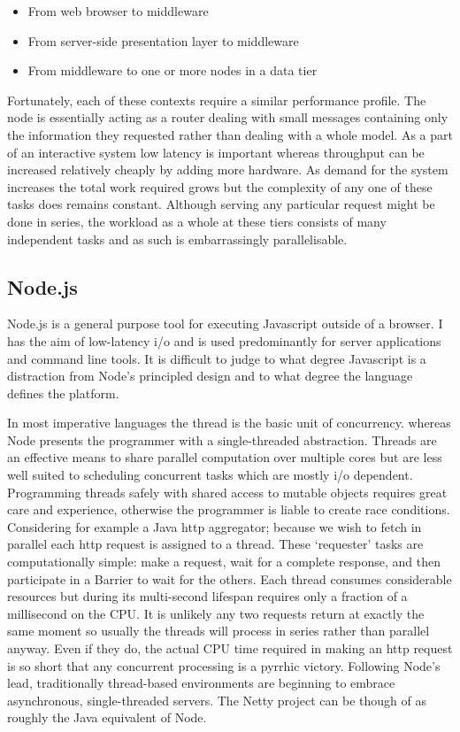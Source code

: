 \documentclass[]{article}
\begin{document}
\begin{itemize}
\itemsep1pt\parskip0pt
\item
  From web browser to middleware
\item
  From server-side presentation layer to middleware
\item
  From middleware to one or more nodes in a data tier
\end{itemize}

Fortunately, each of these contexts require a similar performance
profile. The node is essentially acting as a router dealing with small
messages containing only the information they requested rather than
dealing with a whole model. As a part of an interactive system low
latency is important whereas throughput can be increased relatively
cheaply by adding more hardware. As demand for the system increases the
total work required grows but the complexity of any one of these tasks
does remains constant. Although serving any particular request might be
done in series, the workload as a whole at these tiers consists of many
independent tasks and as such is embarrassingly parallelisable.

\subsection{Node.js}

Node.js is a general purpose tool for executing Javascript outside of a
browser. I has the aim of low-latency i/o and is used predominantly for
server applications and command line tools. It is difficult to judge to
what degree Javascript is a distraction from Node's principled design
and to what degree the language defines the platform.

In most imperative languages the thread is the basic unit of
concurrency. whereas Node presents the programmer with a single-threaded
abstraction. Threads are an effective means to share parallel
computation over multiple cores but are less well suited to scheduling
concurrent tasks which are mostly i/o dependent. Programming threads
safely with shared access to mutable objects requires great care and
experience, otherwise the programmer is liable to create race
conditions. Considering for example a Java http aggregator; because we
wish to fetch in parallel each http request is assigned to a thread.
These `requester' tasks are computationally simple: make a request, wait
for a complete response, and then participate in a Barrier to wait for
the others. Each thread consumes considerable resources but during its
multi-second lifespan requires only a fraction of a millisecond on the
CPU. It is unlikely any two requests return at exactly the same moment
so usually the threads will process in series rather than parallel
anyway. Even if they do, the actual CPU time required in making an http
request is so short that any concurrent processing is a pyrrhic victory.
Following Node's lead, traditionally thread-based environments are
beginning to embrace asynchronous, single-threaded servers. The Netty
project can be though of as roughly the Java equivalent of Node.
\end{document}
